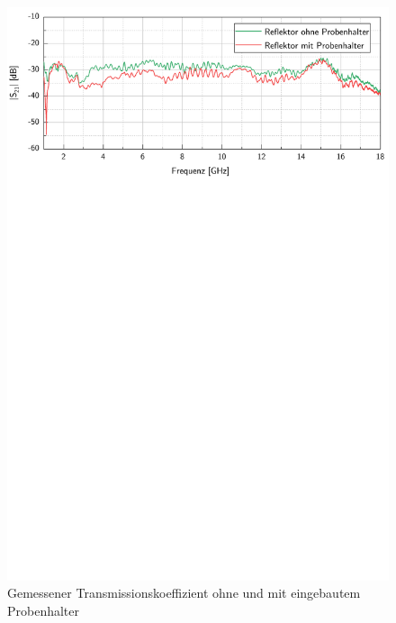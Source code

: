 \begin{figure}[ht]
    \centering
    \includegraphics[page=1, width = .99\textwidth, trim = 0cm 17.4cm 0cm 0cm, clip]{Abbildungen/Kapitel4/Messergebnisse/Vergleich mit und ohne Probenhalter (geerdet).pdf}
    \caption{Gemessener Transmissionskoeffizient ohne und mit eingebautem Probenhalter}
    \label{fig:4_Vergleich_Probenhalter}
\end{figure}


